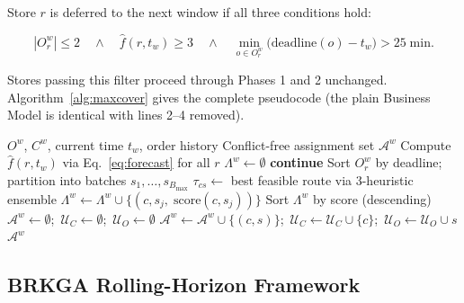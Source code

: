 Store $r$ is deferred to the next window if all three conditions hold:

\begin{equation}\label{eq:wait_condition}
    |O^w_r| \leq 2
    \quad\wedge\quad
    \hat{f}(r, t_w) \geq 3
    \quad\wedge\quad
    \min_{o \in O^w_r}\!\bigl(\text{deadline}(o) - t_w\bigr) > 25\;\text{min.}
\end{equation}

Stores passing this filter proceed through Phases 1 and 2 unchanged.
Algorithm~\ref{alg:maxcover} gives the complete pseudocode (the plain Business Model is identical with lines 2--4 removed).

\begin{algorithm}[ht]
\caption{Business Model Lookahead — window $w$}
\label{alg:maxcover}
\begin{algorithmic}[1]
\Require $O^w$, $C^w$, current time $t_w$, order history
\Ensure Conflict-free assignment set $\mathcal{A}^w$
\State Compute $\hat{f}(r, t_w)$ via Eq.~\eqref{eq:forecast} for all $r$
\State $\Lambda^w \leftarrow \emptyset$
     
        \State \textbf{continue}
    \EndIf
    \State {}
    \State Sort $O^w_r$ by deadline; partition into batches $s_1,\ldots,s_{B_{\max}}$
        \State $\tau_{cs} \leftarrow$ best feasible route via 3-heuristic ensemble
            \State $\Lambda^w \leftarrow \Lambda^w \cup \{(c, s_j,\;\text{score}(c,s_j))\}$
        \EndIf
    \EndFor
\EndFor
\State {}
\State Sort $\Lambda^w$ by score (descending)
\State $\mathcal{A}^w \leftarrow \emptyset$;\ $\mathcal{U}_C \leftarrow \emptyset$;\ $\mathcal{U}_O \leftarrow \emptyset$
        \State $\mathcal{A}^w \leftarrow \mathcal{A}^w \cup \{(c,s)\}$;\ $\mathcal{U}_C \leftarrow \mathcal{U}_C \cup \{c\}$;\ $\mathcal{U}_O \leftarrow \mathcal{U}_O \cup s$
    \EndIf
\EndFor
\State \Return $\mathcal{A}^w$
\end{algorithmic}
\end{algorithm}

\subsection{BRKGA Rolling-Horizon Framework}
\label{subsec:brkga_framework}

